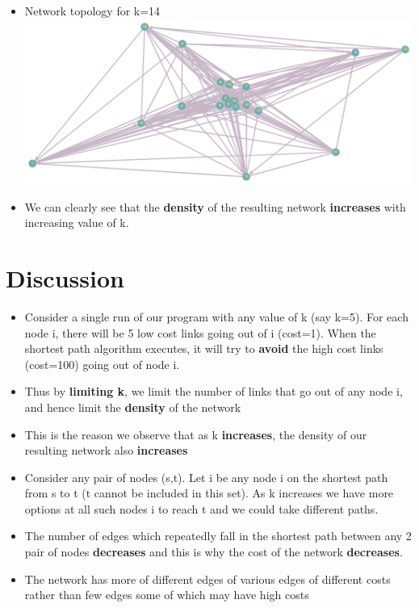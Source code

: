 \documentclass[12pt,letterpaper,titlepage,en-US]{article}
\begin{document}
\begin{itemize}
\item Network topology for k=14\\

\includegraphics[scale=0.35]{fig/k14.png}

\item We can clearly see that the \textbf{density} of the resulting network \textbf{increases} with increasing value of k.
\end{itemize}
 
\section{Discussion}
\begin{itemize}

\item Consider a single run of our program with any value of k (say k=5). For each node i, there will be 5 low cost links going out of i (cost=1). When the shortest path algorithm executes, it will try to \textbf{avoid} the high cost links (cost=100) going out of node i.

\item Thus by \textbf{limiting k}, we limit the number of links that go out of any node i, and hence limit the \textbf{density} of the network

\item This is the reason we observe that as k \textbf{increases}, the density of our resulting network also \textbf{increases}

\item Consider any pair of nodes (s,t). Let i be any node i on the shortest path from s to t (t cannot be included in this set). As k increases we have more options at all such nodes i to reach t and we could take different paths.

\item The number of edges which repeatedly fall in the shortest path between any 2 pair of nodes \textbf{decreases} and this is why the cost of the network \textbf{decreases}.

\item The network has more of different edges of various edges of different costs rather than few edges some of which may have high costs

\end{itemize}
\end{document}
